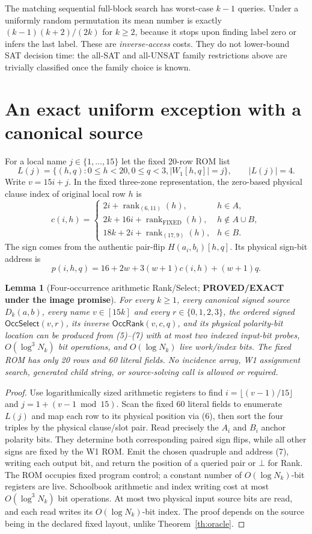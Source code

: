 \documentclass[11pt]{article}
\newtheorem{lemma}[theorem]{Lemma}
\newcommand{\Sel}{\mathsf{OccSelect}}
\newcommand{\Rank}{\mathsf{OccRank}}
\begin{document}
The matching sequential full-block search has worst-case $k-1$ queries.  Under a uniformly random permutation its mean number is exactly $(k-1)(k+2)/(2k)$ for $k\ge2$, because it stops upon finding label zero or infers the last label. These are \emph{inverse-access} costs. They do not lower-bound SAT decision time: the all-SAT and all-UNSAT family restrictions above are trivially classified once the family choice is known.

\section{An exact uniform exception with a canonical source}
For a local name $j\in\{1,\ldots,15\}$ let the fixed 20-row ROM list
\[
L(j)=\{(h,q): 0\le h<20,0\le q<3,
       |W_1[h,q]|=j\},\qquad |L(j)|=4.
\tag{5}
\]
Write $v=15i+j$. In the fixed three-zone representation, the zero-based physical clause index of original local row $h$ is
\[
 c(i,h)=\begin{cases}
 2i+\operatorname{rank}_{(6,11)}(h),&h\in A,\\
 2k+16i+\operatorname{rank}_{\mathrm{FIXED}}(h),&h\notin A\cup B,\\
 18k+2i+\operatorname{rank}_{(17,9)}(h),&h\in B.
 \end{cases}
\tag{6}
\]
The sign comes from the authentic pair-flip $H(a_i,b_i)[h,q]$. Its physical sign-bit address is
\[
 p(i,h,q)=16+2w+3(w+1)c(i,h)+(w+1)q.
\tag{7}
\]

\begin{lemma}[Four-occurrence arithmetic Rank/Select; \textbf{PROVED/EXACT under the image promise}]\label{lem:fixed}
For every $k\ge1$, every canonical signed source $D_k(a,b)$, every name $v\in[15k]$ and every $r\in\{0,1,2,3\}$, the ordered signed $\Sel(v,r)$, its inverse $\Rank(v,c,q)$, and its physical polarity-bit location can be produced from (5)--(7) with \emph{at most two} indexed input-bit probes, $O(\log^3 N_k)$ bit operations, and $O(\log N_k)$ live work/index bits.  The fixed ROM has only 20 rows and 60 literal fields.  No incidence array, W1 assignment search, generated child string, or source-solving call is allowed or required.
\end{lemma}
\begin{proof}
Use logarithmically sized arithmetic registers to find $i=\lfloor(v-1)/15\rfloor$ and $j=1+(v-1\bmod15)$.  Scan the fixed 60 literal fields to enumerate $L(j)$ and map each row to its physical position via (6), then sort the four triples by the physical clause/slot pair.  Read precisely the $A_i$ and $B_i$ anchor polarity bits.  They determine both corresponding paired sign flips, while all other signs are fixed by the W1 ROM.  Emit the chosen quadruple and address (7), writing each output bit, and return the position of a queried pair or $\bot$ for Rank.  The ROM occupies fixed program control; a constant number of $O(\log N_k)$-bit registers are live.  Schoolbook arithmetic and index writing cost at most $O(\log^3N_k)$ bit operations.  At most two physical input source bits are read, and each read writes its $O(\log N_k)$-bit index.  The proof depends on the source being in the declared fixed layout, unlike Theorem~\ref{th:oracle}.
\end{proof}
\end{document}
